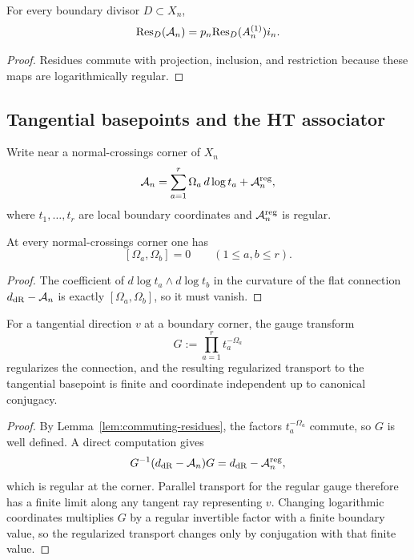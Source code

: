 \begin{corollary}\label{cor:reduced-residues}
For every boundary divisor $D\subset X_n$,
\[
 \mathrm{Res}_D(\mathcal A_n)=p_n\mathrm{Res}_D(A_n^{(1)})i_n.
\]
\end{corollary}

\begin{proof}
Residues commute with projection, inclusion, and restriction because these maps are logarithmically regular.
\end{proof}

\subsection{Tangential basepoints and the HT associator}
Write near a normal-crossings corner of $X_n$
\[
 \mathcal A_n = \sum_{a=1}^r \Omega_a\,d\log t_a + \mathcal A_n^{\mathrm{reg}},
\]
where $t_1,\dots,t_r$ are local boundary coordinates and $\mathcal A_n^{\mathrm{reg}}$ is regular.

\begin{lemma}\label{lem:commuting-residues}
At every normal-crossings corner one has
\[
 [\Omega_a,\Omega_b]=0\qquad (1\le a,b\le r).
\]
\end{lemma}

\begin{proof}
The coefficient of $d\log t_a\wedge d\log t_b$ in the curvature of the flat connection $d_{\mathrm{dR}}-\mathcal A_n$ is exactly $[\Omega_a,\Omega_b]$, so it must vanish.
\end{proof}

\begin{lemma}\label{lem:tangential-regularization}
For a tangential direction $v$ at a boundary corner, the gauge transform
\[
 G := \prod_{a=1}^r t_a^{-\Omega_a}
\]
regularizes the connection, and the resulting regularized transport to the tangential basepoint is finite and coordinate independent up to canonical conjugacy.
\end{lemma}

\begin{proof}
By Lemma~\ref{lem:commuting-residues}, the factors $t_a^{-\Omega_a}$ commute, so $G$ is well defined. A direct computation gives
\[
 G^{-1}(d_{\mathrm{dR}}-\mathcal A_n)G = d_{\mathrm{dR}}-\mathcal A_n^{\mathrm{reg}},
\]
which is regular at the corner. Parallel transport for the regular gauge therefore has a finite limit along any tangent ray representing $v$. Changing logarithmic coordinates multiplies $G$ by a regular invertible factor with a finite boundary value, so the regularized transport changes only by conjugation with that finite value.
\end{proof}

